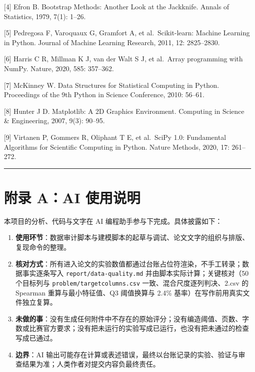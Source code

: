 \documentclass[
  11pt,
]{ctexart}
\providecommand{\tightlist}{%
  \setlength{\itemsep}{0pt}\setlength{\parskip}{0pt}}
\begin{document}
{[}4{]} Efron B. Bootstrap Methods: Another Look at the Jackknife.
Annals of Statistics, 1979, 7(1): 1--26.

{[}5{]} Pedregosa F, Varoquaux G, Gramfort A, et al.~Scikit-learn:
Machine Learning in Python. Journal of Machine Learning Research, 2011,
12: 2825--2830.

{[}6{]} Harris C R, Millman K J, van der Walt S J, et al.~Array
programming with NumPy. Nature, 2020, 585: 357--362.

{[}7{]} McKinney W. Data Structures for Statistical Computing in Python.
Proceedings of the 9th Python in Science Conference, 2010: 56--61.

{[}8{]} Hunter J D. Matplotlib: A 2D Graphics Environment. Computing in
Science \& Engineering, 2007, 9(3): 90--95.

{[}9{]} Virtanen P, Gommers R, Oliphant T E, et al.~SciPy 1.0:
Fundamental Algorithms for Scientific Computing in Python. Nature
Methods, 2020, 17: 261--272.

\begin{center}\rule{0.5\linewidth}{0.5pt}\end{center}

\section{附录 A：AI
使用说明}\label{ux9644ux5f55-aai-ux4f7fux7528ux8bf4ux660e}

本项目的分析、代码与文字在 AI 编程助手参与下完成。具体披露如下：

\begin{enumerate}
\def\labelenumi{\arabic{enumi}.}
\tightlist
\item
  \textbf{使用环节}：数据审计脚本与建模脚本的起草与调试、论文文字的组织与排版、复现命令的整理。
\item
  \textbf{核对方式}：所有进入论文的实验数值都通过台账占位符渲染，不手工转录；数据事实逐条写入
  \texttt{report/\allowbreak{}data-quality.\allowbreak{}md} 并由脚本实际计算；关键核对（50
  个目标列与 \texttt{problem/\allowbreak{}targetcolumns.\allowbreak{}csv}
  一致、混合尺度逐列判决、2.csv 的 Spearman 重算与最小特征值、Q3
  阈值换算与 2.4\% 基率）在写作前用真实文件独立复算。
\item
  \textbf{未做的事}：没有生成任何附件中不存在的原始评分；没有编造阈值、页数、字数或比赛官方要求；没有把未运行的实验写成已运行，也没有把未通过的检查写成已通过。
\item
  \textbf{边界}：AI
  输出可能存在计算或表述错误，最终以台账记录的实验、验证与审查结果为准；人类作者对提交内容负最终责任。
\end{enumerate}
\end{document}
